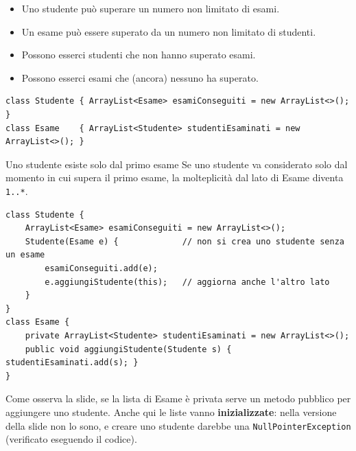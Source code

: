 \noindent\begin{minipage}[c]{0.5\textwidth}
\begin{itemize}
  \item Uno studente può superare un numero non limitato di esami.
  \item Un esame può essere superato da un numero non limitato di studenti.
  \item Possono esserci studenti che non hanno superato esami.
  \item Possono esserci esami che (ancora) nessuno ha superato.
\end{itemize}
\end{minipage}\hfill
\begin{minipage}[c]{0.46\textwidth}
\centering
{}
\end{minipage}

\begin{lstlisting}[style=java]
class Studente { ArrayList<Esame> esamiConseguiti = new ArrayList<>(); }
class Esame    { ArrayList<Studente> studentiEsaminati = new ArrayList<>(); }
\end{lstlisting}

\begin{esempio}{Uno studente esiste solo dal primo esame}
Se uno studente va considerato solo dal momento in cui supera il primo esame, la molteplicità dal lato di Esame diventa \texttt{1..*}.

\begin{center}
\end{center}

\begin{lstlisting}[style=java]
class Studente {
    ArrayList<Esame> esamiConseguiti = new ArrayList<>();
    Studente(Esame e) {             // non si crea uno studente senza un esame
        esamiConseguiti.add(e);
        e.aggiungiStudente(this);   // aggiorna anche l'altro lato
    }
}
class Esame {
    private ArrayList<Studente> studentiEsaminati = new ArrayList<>();
    public void aggiungiStudente(Studente s) { studentiEsaminati.add(s); }
}
\end{lstlisting}
Come osserva la slide, se la lista di Esame è privata serve un metodo pubblico per aggiungere uno studente. Anche qui le liste
vanno \textbf{inizializzate}: nella versione della slide non lo sono, e creare uno studente darebbe una \texttt{NullPointerException}
(verificato eseguendo il codice).
\end{esempio}

